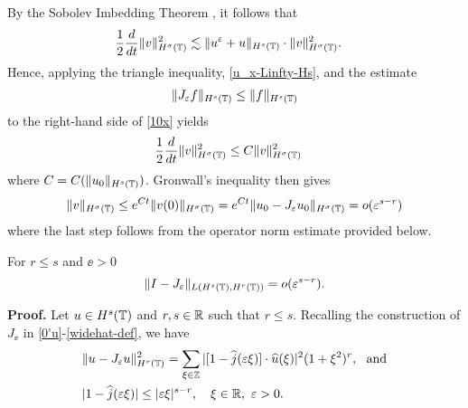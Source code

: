 %
%
By the Sobolev Imbedding Theorem , it follows that 
%
%
\begin{equation}
\begin{split}
\frac{1}{2}\frac{d}{dt} \|v\|_{H^{\sigma}(\mathbb{T})}^2
& \lesssim
\|u^{\varepsilon}
+ u\|_{H^{s}(\mathbb{T})} \cdot \|v\|_{H^{\sigma}(\mathbb{T})}^2.
\label{10x}
\end{split}
\end{equation}
%
%
Hence, applying the triangle inequality, \eqref{u_x-Linfty-Hs}, and the estimate
%
%
\begin{equation}
\begin{split}
	\|J_\varepsilon f\|_{H^s(\mathbb{T})} \le \|f\|_{H^s(\mathbb{T})}
\label{lem100u}
\end{split}
\end{equation}
%
%
%
%
to the right-hand side of \eqref{10x} yields
%
%
%
%
%
\begin{equation*}
\begin{split}
\label{12x}
\frac{1}{2}\frac{d}{dt} \|v\|_{H^{\sigma}(\mathbb{T})}^2
& \le
C \|v\|_{H^{\sigma}(\mathbb{T})}^2
\end{split}
\end{equation*}
%
%
where $C = C(\|u_0\|_{H^s(\mathbb{T})})$. Gronwall's inequality then gives
%
%
%
\begin{equation*}
\label{conc-lemma}
\begin{split}
\|v\|_{H^{\sigma}(\mathbb{T})}
 \le e^{C t}\|v(0)\|_{H^{\sigma}(\mathbb{T})}
 = e^{C t}\|u_0 - J_\varepsilon u_0 \|_{H^{\sigma}(\mathbb{T})} = o(\varepsilon^{s-r})
\end{split}
\end{equation*}
%
%
%
%
%
where the last step follows from the operator norm estimate provided below. 
\qquad \qedsymbol
%
%
\begin{lemma}
\label{lem4r}
For $r \le s$ and $\ee>0$
%
%
\begin{equation}
\label{0r}
\begin{split}
\|I - J_\varepsilon\|_{L(H^s(\mathbb{T}), H^r(\mathbb{T}))} = o(\varepsilon^{s-r}).
\end{split}
\end{equation}
%
%
\end{lemma}
%
%
\textbf{Proof.}
Let $u \in H^s(\mathbb{T})$ and $r, s \in \mathbb{R}$ such that $r \le s$. 
Recalling the construction of $J_\ee$ in
\eqref{0'u}-\eqref{widehat-def}, we have
%
%
\begin{align}
\label{1r}
& \|u - J_\varepsilon u\|_{H^r(\mathbb{T})}^2 = \sum_{\xi \in \mathbb{Z}} | [1- \widehat{j}(\varepsilon 
\xi)] \cdot \widehat{u}(\xi) |^2
(1+\xi^2)^r, \ \ \text{and}
\\
& |1 - \widehat{ j }(\varepsilon \xi)| \le |\varepsilon \xi |^{s-r}, \quad 
\xi \in \mathbb{R}, \ \varepsilon > 0.
\label{2r}
\end{align}
